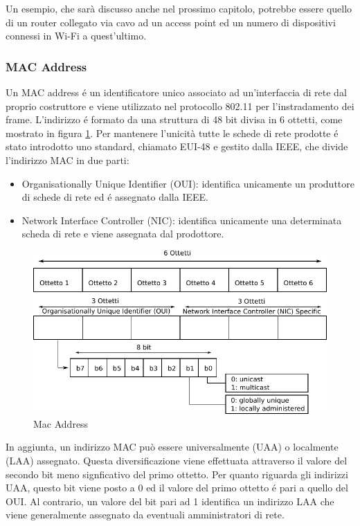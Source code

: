 Un esempio, che sar\`a discusso anche nel prossimo capitolo, potrebbe essere quello di un router collegato via cavo ad un access point ed un numero di dispositivi connessi in Wi-Fi a quest'ultimo.

\newpage

\subsubsection{MAC Address}

Un MAC address \'e un identificatore unico associato ad un'interfaccia di rete dal proprio costruttore e viene utilizzato nel protocollo 802.11 per l'instradamento dei frame.
L'indirizzo \'e formato da una struttura di 48 bit divisa in 6 ottetti, come mostrato in figura \ref{fig:macaddress}.
Per mantenere l'unicit\`a tutte le schede di rete prodotte \'e stato introdotto uno standard, chiamato EUI-48 e gestito dalla IEEE, che divide l'indirizzo MAC in due parti:
\begin{itemize}
	\item Organisationally Unique Identifier (OUI): identifica unicamente un produttore di schede di rete ed \'e assegnato dalla IEEE.
	\item Network Interface Controller (NIC): identifica unicamente una determinata scheda di rete e viene assegnata dal prodottore.
\end{itemize}

\begin{figure}[!htb]
	\centering
	\includegraphics{images/img7.pdf}
	\caption{Mac Address}
	\label{fig:macaddress}
\end{figure}

In aggiunta, un indirizzo MAC pu\`o essere universalmente (UAA) o localmente (LAA) assegnato.
Questa diversificazione viene effettuata attraverso il valore del secondo bit meno signficativo del primo ottetto.
Per quanto riguarda gli indirizzi UAA, questo bit viene posto a 0 ed il valore del primo ottetto \'e pari a quello del OUI.
Al contrario, un valore del bit pari ad 1 identifica un indirizzo LAA che viene generalmente assegnato da eventuali amministratori di rete.

